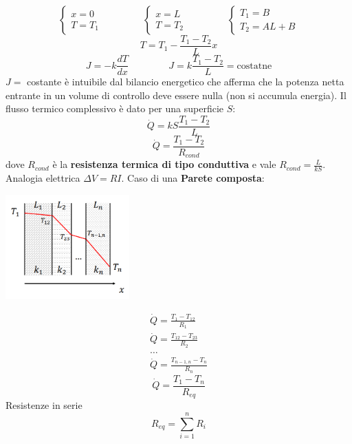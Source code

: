 \[
    \begin{cases}
        x = 0\\ T = T_1
    \end{cases} \;\;\;\;\;\;\;\;\;\;\;\;\;\;\; \begin{cases}
        x = L\\ T = T_2
    \end{cases} \;\;\;\;\;\;\;\;\;\;\;\;\;\;\; \begin{cases}
        T_1 = B \\ T_2 = AL+B
    \end{cases}
\]
\[
    T = T_1 - \frac{T_1-T_2}{L}x
\]
\[
    J = - k \frac{dT}{dx} \;\;\;\;\;\;\;\;\;\;\;\;\;\;\; J = k \frac{T_1-T_2}{L} = \text{costatne}
\]
$J =$ costante è intuibile dal bilancio energetico che afferma che la potenza netta entrante in un volume di controllo deve essere nulla (non si accumula energia).\newline
\newline
Il flusso termico complessivo è dato per una superficie $S$:
\[
    \dot{Q} = k S \frac{T_1-T_2}{L}
\]
\[
    \dot{Q} = \frac{T_1-T_2}{R_{cond}}
\]
dove $R_{cond}$ è la \textbf{resistenza termica di tipo conduttiva} e vale $R_{cond} = \frac{L}{kS}$.\newline
\newline
Analogia elettrica $\Delta V = RI$.\newline
\newline
Caso di una \textbf{Parete composta}:
\begin{center}
    \includegraphics[height=4cm]{../L10/img3.PNG}
\end{center}
\[
    \begin{matrix}
        \dot{Q} = \frac{T_1-T_{12}}{R_1}\\
        \dot{Q} = \frac{T_{12} - T_{23}}{R_2}\\
        \dots\\
        \dot{Q} = \frac{T_{n-1,n} - T_{n}}{R_n}
    \end{matrix}  
\]
\[
    \dot{Q} = \frac{T_1-T_n}{R_{eq}}
\]
Resistenze in serie
\[
    R_{eq} = \sum_{i=1}^{n}R_i
\]
